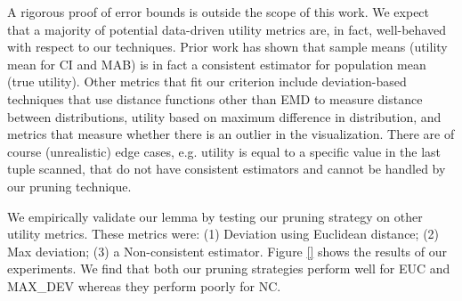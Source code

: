 A rigorous proof of error bounds is outside the scope of this work.
We expect that a majority of potential data-driven utility metrics are, in fact, well-behaved with respect to 
our techniques.
Prior work has shown that sample means (utility mean for CI and MAB) is in fact a consistent estimator for
population mean (true utility)\cite{mean_is_consistent}.
Other metrics that fit our criterion include deviation-based techniques that use distance functions other than 
EMD to measure distance between distributions, utility based on maximum difference in distribution, 
and metrics that measure whether there is an outlier in the visualization.
There are of course (unrealistic) edge cases, e.g. utility is equal to a specific value in the last tuple scanned, that
do not have consistent estimators and cannot be handled by our pruning technique.

We empirically validate our lemma by testing our pruning strategy on other utility metrics. 
These metrics were: (1) Deviation using Euclidean distance; (2) Max deviation; (3) a Non-consistent
estimator.
Figure \ref{} shows the results of our experiments. 
We find that both our pruning strategies perform well for EUC and MAX\_DEV whereas they perform
poorly for NC.
\fi












